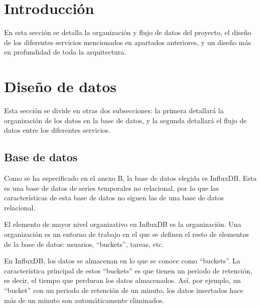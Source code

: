 
\section{Introducción}

En esta sección se detalla la organización y flujo de datos del proyecto, el diseño de los diferentes 
servicios mencionados en apartados anteriores, y un diseño más en profundidad de toda la arquitectura.

\section{Diseño de datos}

Esta sección se divide en otras dos subsecciones: la primera detallará la organización de los datos 
en la base de datos, y la segunda detallará el flujo de datos entre los diferentes servicios.

\subsection{Base de datos}

Como se ha especificado en el anexo B, la base de datos elegida es InfluxDB. Esta es una base de datos 
de series temporales no relacional, por lo que las características de esta base de datos no siguen 
las de una base de datos relacional.

El elemento de mayor nivel organizativo en InfluxDB es la organización. Una organización es un 
entorno de trabajo en el que se definen el resto de elementos de la base de datos: usuarios, ``buckets'',
tareas, etc.

En InfluxDB, los datos se almacenan en lo que se conoce como ``buckets''. La característica principal
de estos ``buckets'' es que tienen un periodo de retención, es decir, el tiempo que perduran los datos
almacenados. Así, por ejemplo, un ``bucket'' con un periodo de retención de un minuto, los datos insertados
hace más de un minuto son automáticamente eliminados. 

